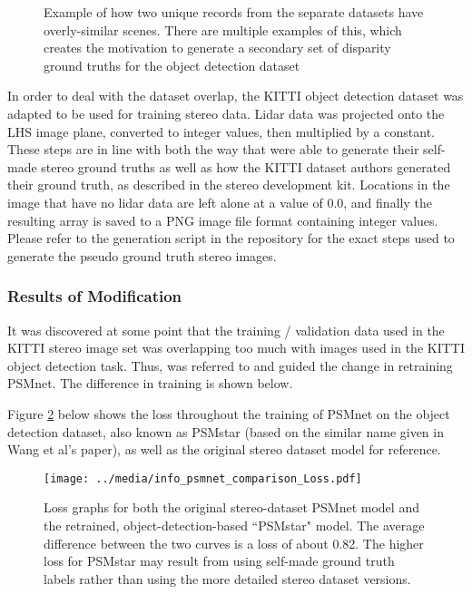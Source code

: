 \begin{figure}[ht]
	\centering
	\caption{Example of how two unique records from the separate datasets have overly-similar scenes. There are multiple examples of this, which creates the motivation to generate a secondary set of disparity ground truths for the object detection dataset}
	\label{similarity_stereo_objdet}
\end{figure}

In order to deal with the dataset overlap, the KITTI object detection dataset was adapted to be used for training stereo data. Lidar data was projected onto the LHS image plane, converted to integer values, then multiplied by a constant. These steps are in line with both the way that \cite{wang_pseudo-lidar_2019} were able to generate their self-made stereo ground truths as well as how the KITTI dataset authors generated their ground truth, as described in the stereo development kit. Locations in the image that have no lidar data are left alone at a value of 0.0, and finally the resulting array is saved to a PNG image file format containing integer values. Please refer to the generation script in the repository for the exact steps used to generate the pseudo ground truth stereo images.

\subsubsection{Results of Modification}
It was discovered at some point that the training / validation data used in the KITTI stereo image set was overlapping too much with images used in the KITTI object detection task. Thus, \cite{wang_pseudo-lidar_2019} was referred to and guided the change in retraining PSMnet. The difference in training is shown below.

Figure \ref{psmnet_star_train_info} below shows the loss throughout the training of PSMnet on the object detection dataset, also known as PSMstar (based on the similar name given in Wang et al's paper), as well as the original stereo dataset model for reference. 

\begin{figure}[ht]
	\centering
	\texttt{[image: ../media/info\_psmnet\_comparison\_Loss.pdf]}
	\caption{Loss graphs for both the original stereo-dataset PSMnet model and the retrained, object-detection-based ``PSMstar" model. The average difference between the two curves is a loss of about 0.82. The higher loss for PSMstar may result from using self-made ground truth labels rather than using the more detailed stereo dataset versions.}
	\label{psmnet_star_train_info}
\end{figure}

